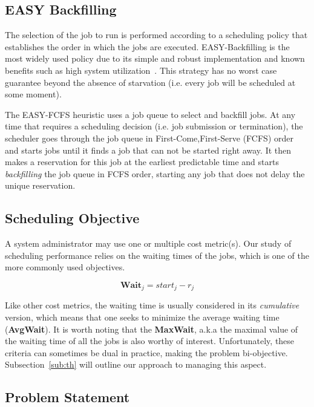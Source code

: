 \documentclass[sigconf]{acmart}
\begin{document}
\subsection{EASY Backfilling}
\label{sub:easy}

The selection of the job to run is performed according to a
scheduling policy that establishes the order in which the jobs are executed.
EASY-Backfilling is the most widely used policy due to its simple and robust
implementation and known benefits such as high system
utilization~\cite{easy}. This strategy has no worst case guarantee beyond
the absence of starvation (i.e. every job will be scheduled at some moment).

The EASY-FCFS heuristic uses a job queue to select and backfill jobs.  At any
time that requires a scheduling decision (i.e. job submission or termination),
the scheduler goes through the job queue in First-Come,First-Serve (FCFS) order
and starts jobs until it finds a job that can not be started right away. It
then makes a reservation for this job at the earliest predictable time and
starts \textit{backfilling} the job queue in FCFS order, starting any job that
does not delay the unique reservation.

\subsection{Scheduling Objective}
\label{sub:scheduling_objectives}

A system administrator may use one or multiple cost metric(s). Our study of
scheduling performance relies on the waiting times of the jobs, which is one of
the more commonly used objectives.

    \begin{equation}
      \textbf{Wait}_j =  start_j-r_j
    \end{equation}

Like other cost metrics, the waiting time is usually considered in its
\textit{cumulative} version, which means that one seeks to minimize the average
waiting time (\textbf{AvgWait}). It is worth noting that the \textbf{MaxWait},
a.k.a the maximal value of the waiting time of all the jobs is also worthy of
interest. Unfortunately, these criteria can sometimes be dual in practice,
making the problem bi-objective. Subsection~\ref{sub:th} will outline our
approach to managing this aspect.

\subsection{Problem Statement}
\end{document}
